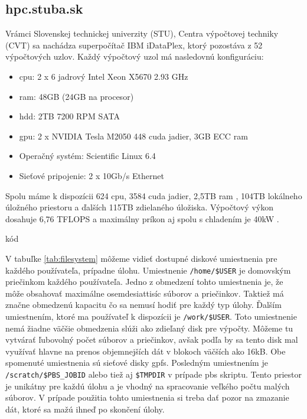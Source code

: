 \subsection{hpc.stuba.sk}
Vrámci Slovenskej technickej univerzity (STU), Centra výpočtovej techniky (CVT) sa nachádza superpočítač IBM iDataPlex, ktorý pozostáva z 52 výpočtových uzlov.
Každý výpočtový uzol má nasledovnú konfiguráciu:
\begin{itemize}
\item \acrshort{cpu}: 2 x 6 jadrový Intel Xeon X5670 2.93 GHz
\item \acrshort{ram}: 48GB (24GB na procesor)
\item \acrshort{hdd}: 2TB 7200 RPM SATA
\item \acrshort{gpu}: 2 x NVIDIA Tesla M2050 448 cuda jadier, 3GB ECC \acrshort{ram}
\item Operačný systém: Scientific Linux 6.4
\item Sieťové pripojenie: 2 x 10Gb/s Ethernet
\end{itemize}
Spolu máme k dispozícii 624 \acrshort{cpu}, 3584 cuda jadier, 2,5TB \acrshort{ram} , 104TB lokálneho úložného priestoru a ďalších 115TB zdielaného úložiska.
Výpočtový výkon dosahuje 6,76 TFLOPS a maximálny príkon aj spolu s chladením je 40kW \cite{hpc}.

kód

V tabuľke \ref{tab:filesystem} môžeme vidieť dostupné diskové umiestnenia pre každého používateľa, prípadne úlohu.
Umiestnenie \texttt{/home/\$USER} je domovským priečinkom každého používateľa.
Jedno z obmedzení tohto umiestnenia je, že môže obsahovať maximálne osemdesiattisíc súborov a priečinkov.
Taktiež má značne obmedzenú kapacitu čo sa nemusí hodiť pre každý typ úlohy.
Ďalším umiestnením, ktoré ma používateľ k dispozícii je \texttt{/work/\$USER}.
Toto umiestnenie nemá žiadne väčšie obmedzenia slúži ako zdieľaný disk pre výpočty.
Môžeme tu vytvárať ľubovolný počet súborov a priečinkov, avšak podľa \cite{hpc} by sa tento disk mal využívať hlavne na prenos objemnejších dát v blokoch väčších ako 16kB. Obe spomenuté umiestnenia sú sieťové disky \acrshort{gpfs}.
Posledným umiestnením je \texttt{/scratch/\$PBS\_JOBID} alebo tiež aj \texttt{\$TMPDIR} v prípade \acrshort{pbs} skriptu.
Tento priestor je unikátny pre každú úlohu a je vhodný na spracovanie veľkého počtu malých súborov.
V prípade použitia tohto umiestnenia si treba dať pozor na zmazanie dát, ktoré sa mažú ihneď po skončení úlohy.

